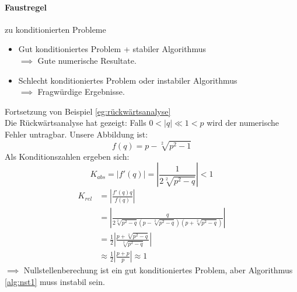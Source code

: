 \paragraph{Faustregel}zu konditionierten Probleme
\begin{itemize}
	\item Gut konditioniertes Problem + stabiler Algorithmus \\ $\implies$ Gute numerische Resultate.
\item Schlecht konditioniertes Problem oder instabiler Algorithmus \\ $\implies$ Fragwürdige Ergebnisse.
\end{itemize}

\begin{example}
Fortsetzung von Beispiel \ref{eg:rückwärtsanalyse} \\
Die Rückwärtsanalyse hat gezeigt: Falls $0<|q| \ll 1 <p$ wird der numerische Fehler untragbar.
Unsere Abbildung ist:
\[
f(q)=p-\sqrt[2]{p^2-1}
\]
Als Konditionszahlen ergeben sich:
\begin{equation*}
K_{abs} = |f'(q)|= |\frac{1}{2\sqrt[2]{p^2-q}}| < 1
\end{equation*}
\begin{align*}
	K_{rel} 
	&= \left|\frac{f'(q)q}{f(q)} \right| \\
	&= \left|\frac{q}{2\sqrt[2]{p^2-q}(p-\sqrt[2]{p^2-q})(p+\sqrt[2]{p^2-q})} \right| \\
	&=\frac{1}{2} \left|\frac{p+\sqrt[2]{p^2-q}}{\sqrt[2]{p^2-q}} \right| \\
	&\approx \frac{1}{2} \left|\frac{p+p}{p}\right| \approx 1
\end{align*}%
$\implies$ Nullstellenberechung ist ein gut konditioniertes Problem, aber  Algorithmus \ref{alg:nst1} muss instabil sein.
\end{example}

